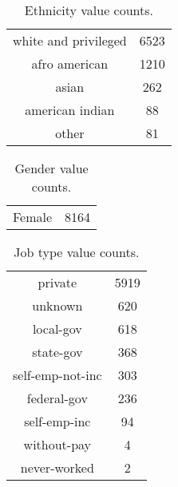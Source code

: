 \begin{table}[!h]
    \caption{Ethnicity value counts.}
    \label{tab:ethnicity_value_counts}
    \centering
    \begin{tabular}{cc}
        white and privileged & 6523 \\
        afro american & 1210 \\
        asian & 262 \\
        american indian & 88 \\
        other & 81 \\
    \end{tabular}
\end{table}

\begin{table}[!h]
    \caption{Gender value counts.}
    \label{tab:gender_value_counts}
    \centering
    \begin{tabular}{cc}
        Female & 8164 \\
    \end{tabular}
\end{table}

\begin{table}[!h]
    \caption{Job type value counts.}
    \label{tab:job_type_value_counts}
    \centering
    \begin{tabular}{cc}
        private & 5919 \\
        unknown & 620 \\
        local-gov & 618 \\
        state-gov & 368 \\
        self-emp-not-inc & 303 \\
        federal-gov & 236 \\
        self-emp-inc & 94 \\
        without-pay & 4 \\
        never-worked & 2 \\
    \end{tabular}
\end{table}

